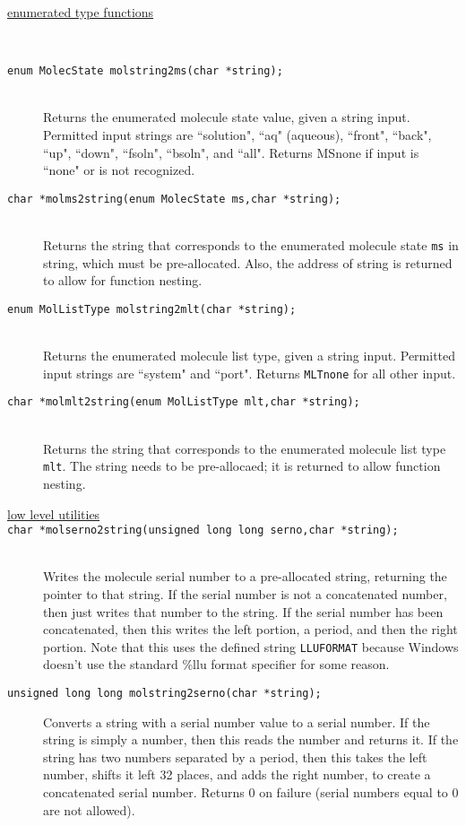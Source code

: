 \documentclass {book}
\newcommand {\ttt} {\texttt}
\begin{document}
\begin{description}

\item[\underline{enumerated type functions}]
\hfill \\

\item[\ttt{enum MolecState molstring2ms(char *string);}]
\hfill \\
Returns the enumerated molecule state value, given a string input. Permitted input strings are ``solution", ``aq" (aqueous), ``front", ``back", ``up", ``down", ``fsoln", ``bsoln", and ``all". Returns MSnone if input is ``none" or is not recognized.

\item[\ttt{char *molms2string(enum MolecState ms,char *string);}]
\hfill \\
Returns the string that corresponds to the enumerated molecule state \ttt{ms} in string, which must be pre-allocated. Also, the address of string is returned to allow for function nesting.

\item[\ttt{enum MolListType molstring2mlt(char *string);}]
\hfill \\
Returns the enumerated molecule list type, given a string input. Permitted input strings are ``system" and ``port". Returns \ttt{MLTnone} for all other input.

\item[\ttt{char *molmlt2string(enum MolListType mlt,char *string);}]
\hfill \\
Returns the string that corresponds to the enumerated molecule list type \ttt{mlt}. The string needs to be pre-allocaed; it is returned to allow function nesting.

\item[\underline{low level utilities}]

\item[\ttt{char *molserno2string(unsigned long long serno,char *string);}]
\hfill \\
Writes the molecule serial number to a pre-allocated string, returning the pointer to that string. If the serial number is not a concatenated number, then just writes that number to the string. If the serial number has been concatenated, then this writes the left portion, a period, and then the right portion. Note that this uses the defined string \ttt{LLUFORMAT} because Windows doesn't use the standard \%llu format specifier for some reason.

\item[\ttt{unsigned long long molstring2serno(char *string);}]
\hfill
Converts a string with a serial number value to a serial number. If the string is simply a number, then this reads the number and returns it. If the string has two numbers separated by a period, then this takes the left number, shifts it left 32 places, and adds the right number, to create a concatenated serial number. Returns 0 on failure (serial numbers equal to 0 are not allowed).


\end{description}
\end{document}
